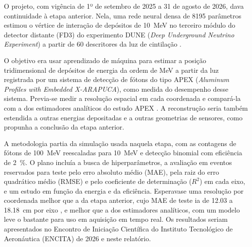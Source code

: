 \label{sec:resumo_plano}

O projeto, com vigência de 1º de setembro de 2025 a 31 de agosto de 2026, dava continuidade à etapa anterior. Nela, uma rede neural densa de \num{8195} parâmetros estimou o vértice de interação de depósitos de \qty{10}{\MeV} no terceiro módulo do detector distante (FD3) do experimento DUNE (\textit{Deep Underground Neutrino Experiment}) a partir de \num{60} descritores da luz de cintilação \cite{vicentin2024study}.

O objetivo era usar aprendizado de máquina para estimar a posição tridimensional de depósitos de energia da ordem de MeV a partir da luz registrada por um sistema de detecção de fótons do tipo APEX (\textit{Aluminum Profiles with Embedded X-ARAPUCA}), como medida do desempenho desse sistema. Previa-se medir a resolução espacial em cada coordenada e compará-la com a dos estimadores analíticos do estudo APEX \cite{marinho2025apex}. A reconstrução seria também estendida a outras energias depositadas e a outras geometrias de sensores, como propunha a conclusão da etapa anterior.

A metodologia partia da simulação usada naquela etapa, com as contagens de fótons de \qty{100}{\MeV} reescaladas para \qty{10}{\MeV} e detecção binomial com eficiência de \qty{2}{\percent}. O plano incluía a busca de hiperparâmetros, a avaliação em eventos reservados para teste pelo erro absoluto médio (MAE), pela raiz do erro quadrático médio (RMSE) e pelo coeficiente de determinação ($R^2$) em cada eixo, e um estudo em função da energia e da eficiência. Esperava\discretionary{-}{-}{-}se uma resolução por coordenada melhor que a da etapa anterior, cujo MAE de teste ia de \num{12.03} a \qty{18.18}{\cm} por eixo \cite{vicentin2024study}, e melhor que a dos estimadores analíticos, com um modelo leve o bastante para uso em aquisição em tempo real. Os resultados seriam apresentados no Encontro de Iniciação Científica do Instituto Tecnológico de Aeronáutica (ENCITA) de 2026 e neste relatório.
